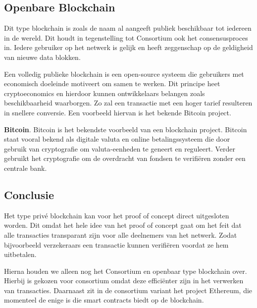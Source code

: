 \subsection{Openbare Blockchain}
Dit type blockchain is zoals de naam al aangeeft publiek beschikbaar tot iedereen in de wereld. Dit houdt in tegenstelling tot Consortium ook het consensusproces in. Iedere gebruiker op het netwerk is gelijk en heeft zeggenschap op de geldigheid van nieuwe data blokken. \par

Een volledig publieke blockchain is een open-source systeem die gebruikers met economisch doeleinde motiveert om samen te werken. Dit principe heet cryptoeconomics en hierdoor kunnen ontwikkelaars belangen zoals beschikbaarheid waarborgen. Zo zal een transactie met een hoger tarief resulteren in snellere conversie. Een voorbeeld hiervan is het bekende Bitcoin project.

\textbf{Bitcoin}. Bitcoin is het bekendste voorbeeld van een blockchain project. Bitcoin staat vooral bekend als digitale valuta en online betalingssysteem die door gebruik van cryptografie om valuta-eenheden te geneert en reguleert. Verder gebruikt het cryptografie om de overdracht van fondsen te verifiëren zonder een centrale bank.\par

\newpage
\subsection{Conclusie}\label{conclusionBlockchain}
Het type privé blockchain kan voor het proof of concept direct uitgesloten worden. Dit omdat het hele idee van het proof of concept gaat om het feit dat alle transacties transparant zijn voor alle deelnemers van het netwerk. Zodat bijvoorbeeld verzekeraars een transactie kunnen verifiëren voordat ze hem uitbetalen.\par

Hierna houden we alleen nog het Consortium en openbaar type blockchain over. Hierbij is gekozen voor consortium omdat deze efficiënter zijn in het verwerken van transacties. Daarnaast zit in de consortium variant het project Ethereum, die momenteel de enige is die smart contracts biedt op de blockchain.